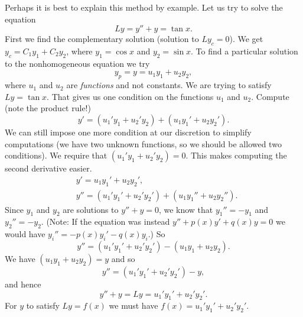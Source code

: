 \documentclass[12pt]{book}
\begin{document}
Perhaps it is best to explain this method by example.
Let us try to solve the equation
\begin{equation*}
Ly = y''+y = \tan x .
\end{equation*}
First we find the complementary solution (solution to $Ly_c = 0$).  
We get $y_c = C_1 y_1 + C_2 y_2$, where $y_1 = \cos x$ and $y_2 = \sin x$.
To find a particular solution to the nonhomogeneous equation we try
\begin{equation*}
y_p = y = u_1 y_1 + u_2 y_2 ,
\end{equation*}
where $u_1$ and $u_2$ are \emph{functions} and not constants.
We are trying to satisfy $Ly = \tan x$.  That gives us one condition on the
functions $u_1$ and $u_2$.
Compute (note the product rule!)
\begin{equation*}
y' = (u_1' y_1 + u_2' y_2) + (u_1 y_1' + u_2 y_2').
\end{equation*}
We can still
impose one more condition at our discretion to simplify computations (we have two unknown functions,
so we should be allowed two conditions).  We require that
$(u_1' y_1 + u_2' y_2) = 0$.  This makes computing the second derivative
easier.
\begin{align*}
& y' = u_1 y_1' + u_2 y_2' , \\
& y'' = (u_1' y_1' + u_2' y_2') + (u_1 y_1'' + u_2 y_2'') .
\end{align*}
Since $y_1$ and $y_2$ are solutions to $y''+y = 0$, we know
that $y_1'' = - y_1$
and $y_2'' = - y_2$.
(Note: If the equation was instead $y''+p(x)y' +q(x)y = 0$ we would have
$y_i'' = -p(x)y_i' -q(x)y_i$.) So 
\begin{equation*}
y'' = (u_1' y_1' + u_2' y_2') - (u_1 y_1 + u_2 y_2) .
\end{equation*}
We have $(u_1 y_1 + u_2 y_2) = y$ and so
\begin{equation*}
y'' = (u_1' y_1' + u_2' y_2') - y ,
\end{equation*}
and hence
\begin{equation*}
y'' + y = Ly = u_1' y_1' + u_2' y_2' .
\end{equation*}
For $y$ to satisfy $Ly = f(x)$ we must have
$f(x) = u_1' y_1' + u_2' y_2'$.
\end{document}

